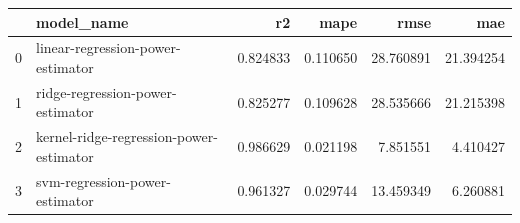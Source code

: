 \begin{tabular}{llrrrr}
\toprule
 & model_name & r2 & mape & rmse & mae \\
\midrule
0 & linear-regression-power-estimator & 0.824833 & 0.110650 & 28.760891 & 21.394254 \\
1 & ridge-regression-power-estimator & 0.825277 & 0.109628 & 28.535666 & 21.215398 \\
2 & kernel-ridge-regression-power-estimator & 0.986629 & 0.021198 & 7.851551 & 4.410427 \\
3 & svm-regression-power-estimator & 0.961327 & 0.029744 & 13.459349 & 6.260881 \\
\bottomrule
\end{tabular}
